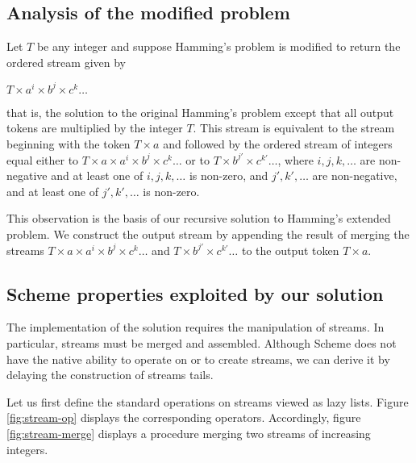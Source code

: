 \subsection{Analysis of the modified problem}

Let $T$ be any integer and suppose Hamming's problem is modified
to return the ordered stream given by

\begin{center}
$T \times a^i \times b^j \times c^k \ldots$
\end{center}

\noindent
that is, the solution to the original Hamming's problem except that
all output tokens are multiplied by the integer $T$.  This stream is
equivalent to the stream beginning with the token $T \times a$ and
followed by the ordered stream of integers equal either to $T \times a
\times a^i \times b^j \times c^k \ldots$ or to $T \times b^{j'} \times
c^{k'} \ldots$, where $i, j, k, \ldots$ are non-negative and at least
one of $i,j,k, \ldots$ is non-zero, and $j', k', \ldots$ are
non-negative, and at least one of $j',k', \ldots$ is non-zero.

This observation is the basis of our recursive solution to Hamming's
extended problem.  We construct the output stream by appending the
result of merging the streams $T \times a \times a^i \times b^j \times
c^k \ldots$ and $T \times b^{j'} \times c^{k'} \ldots$ to the output
token $T \times a$.

\subsection{Scheme properties exploited by our solution}

The implementation of the solution requires the manipulation of
streams.  In particular, streams must be merged and assembled.
Although Scheme does not have the native ability to operate on or to
create streams, we can derive it by delaying the construction of
streams tails.

Let us first define the standard operations on streams viewed as lazy
lists.  Figure \ref{fig:stream-op} displays the corresponding
operators.  Accordingly, figure \ref{fig:stream-merge} displays a
procedure merging two streams of increasing integers.

